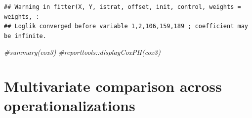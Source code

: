 \documentclass[
]{article}
\newenvironment{Shaded}{\begin{snugshade}}{\end{snugshade}}
\newcommand{\CommentTok}[1]{\textcolor[rgb]{0.56,0.35,0.01}{\textit{#1}}}
\begin{document}
\begin{verbatim}
## Warning in fitter(X, Y, istrat, offset, init, control, weights = weights, :
## Loglik converged before variable 1,2,106,159,189 ; coefficient may be infinite.
\end{verbatim}

\begin{Shaded}
\begin{Highlighting}[]
\CommentTok{#summary(cox3)}
\CommentTok{#reporttools::displayCoxPH(cox3)}
\end{Highlighting}
\end{Shaded}

\hypertarget{multivariate-comparison-across-operationalizations}{%
\section{Multivariate comparison across
operationalizations}\label{multivariate-comparison-across-operationalizations}}
\end{document}
